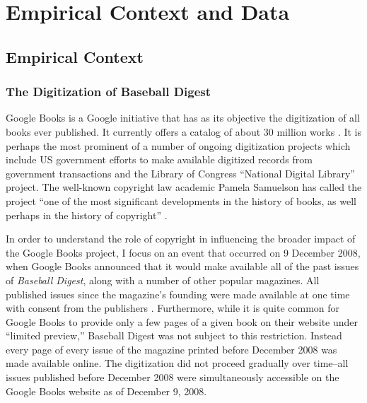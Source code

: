 \documentclass[11pt]{article}
\begin{document}
\section{Empirical Context and Data}
\label{sec:setting}

\subsection{Empirical Context}


\subsubsection{The Digitization of Baseball Digest}

Google Books is a Google initiative that has as its objective the digitization of all books ever published. It currently offers a catalog of about 30 million works \citep{wu_what_2015}. It is perhaps the most prominent of a number of ongoing digitization projects which include US government efforts to make available digitized records from government transactions and the Library of Congress ``National Digital Library'' project. The well-known copyright law academic Pamela Samuelson has called the project ``one of the most significant developments in the history of books, as well perhaps in the history of copyright'' \citep{samuelson_google_2009}. 

In order to understand the role of copyright in influencing the broader impact of the Google Books project, I focus on an event that occurred on 9 December 2008, when Google Books announced that it would make available all of the past issues of \emph{Baseball Digest}, along with a number of other popular magazines. All published issues since the magazine's founding were made available at one time with consent from the publishers \citep{foulser_search_2008}. Furthermore, while it is quite common for Google Books to provide only a few pages of a given book on their website under ``limited preview,'' Baseball Digest was not subject to this restriction. Instead every page of every issue of the magazine printed before December 2008 was made available online. The digitization did not proceed gradually over time--all issues published before December 2008 were simultaneously accessible on the Google Books website as of December 9, 2008. 
\end{document}
